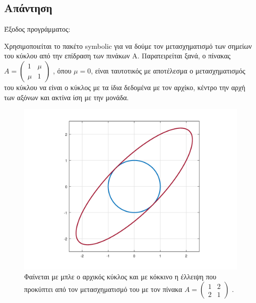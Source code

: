 \documentclass[a4paper,12pt]{article}
\begin{document}
\subsection{Απάντηση}
Έξοδος προγράμματος:

Χρησιμοποιείται το πακέτο symbolic για να δούμε τον μετασχηματισμό των σημείων του κύκλου από
την επίδραση των πινάκων Α.
Παρατειρείται ξανά, ο πίνακας
$
    A = \begin{pmatrix}
        1   & \mu \\
        \mu & 1
    \end{pmatrix}
$
, όπου $\mu = 0$, είναι ταυτοτικός με αποτέλεσμα ο μετασχηματισμός του κύκλου να είναι ο κύκλος
με τα ίδια δεδομένα με τον αρχίκο, κέντρο την αρχή των αξόνων και ακτίνα ίση με την μονάδα.
\begin{figure}
    \centering
    \includegraphics[scale=0.6]{a.png}
    \caption{Φαίνεται με μπλε ο αρχικός κύκλος και με κόκκινο η έλλειψη που προκύπτει από τον
        μετασχηματισμό του με τον πίνακα
        $
            A=\begin{pmatrix}
                1 & 2 \\
                2 & 1
            \end{pmatrix}
        $
        .}
\end{figure}
\end{document}
